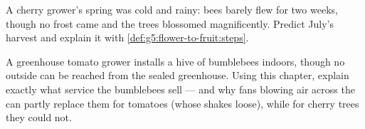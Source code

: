 \begin{exercise}[$\star\star$]\label{exo:g5:flower-to-fruit:10}
A cherry grower's spring was cold and rainy: bees barely
flew for two weeks, though no frost came and the trees
blossomed magnificently. Predict July's harvest and explain
it with \cref{def:g5:flower-to-fruit:steps}.
\end{exercise}

\begin{exercise}[$\star\star\star$]\label{exo:g5:flower-to-fruit:11}
A greenhouse tomato grower installs a hive of bumblebees
indoors, though no  outside can be reached from the
sealed greenhouse. Using this chapter, explain exactly what
service the bumblebees sell --- and why fans blowing air
across the  can partly replace them for tomatoes
(whose  shakes loose), while for cherry trees they
could not.
\end{exercise}
